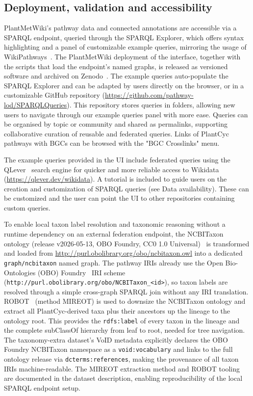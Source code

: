 \documentclass[11pt,a4paper]{article}
\begin{document}
\subsection*{Deployment, validation and accessibility}
PlantMetWiki's pathway data and connected annotations are accessible via a SPARQL
endpoint, queried through the SPARQL Explorer, which offers syntax highlighting and a panel of
customizable example queries, mirroring the usage of WikiPathways~\cite{martens2020}.
The PlantMetWiki deployment of the interface,
together with the scripts that load the endpoint's named graphs, is released as versioned software
and archived on Zenodo~\cite{delpup2026snorql}. The example queries auto-populate the SPARQL
Explorer and can be adapted by users directly on the browser, or in a customizable GitHub repository
(\url{https://github.com/pathway-lod/SPARQLQueries}). This repository stores queries in folders,
allowing new users to navigate through our example queries panel with more ease. Queries
can be organised by topic or community and shared as permalinks, supporting collaborative curation of
reusable and federated queries. Links of PlantCyc pathways with BGCs can be browsed with the "BGC
Crosslinks" menu.

The example queries provided in the UI include federated queries using the QLever~\cite{qlever2017}
search engine for quicker and more reliable access to Wikidata
(\url{https://qlever.dev/wikidata}). A tutorial is included to guide users on the
creation and customization of SPARQL queries (see Data availability). These can be customized and the
user can point the UI to other repositories containing custom queries.

To enable local taxon label resolution and taxonomic reasoning without a runtime dependency on an
external federation endpoint, the NCBITaxon ontology (release v2026-05-13, OBO Foundry, CC0 1.0
Universal)~\cite{federhen2012} is transformed and loaded from \url{http://purl.obolibrary.org/obo/ncbitaxon.owl} into a
dedicated \texttt{graph/ncbitaxon} named graph. The pathway IRIs already use the Open Bio-Ontologies
(OBO) Foundry~\cite{smith2007} IRI scheme
(\texttt{http://\allowbreak{}purl.\allowbreak{}obolibrary.\allowbreak{}org/\allowbreak{}obo/\allowbreak{}NCBITaxon\_\allowbreak{}<id>}), so taxon labels are resolved through a
simple cross-graph SPARQL join without any IRI translation. ROBOT~\cite{jackson2019} (method MIREOT) is
used to downsize the NCBITaxon ontology and extract all PlantCyc-derived taxa plus their ancestors up
the lineage to the ontology root. This provides the \texttt{rdfs:label} of every taxon in the lineage
and the complete subClassOf hierarchy from leaf to root, needed for tree navigation. The
taxonomy-extra dataset's VoID metadata explicitly declares the OBO Foundry NCBITaxon namespace as a
\texttt{void:vocabulary} and links to the full ontology release via \texttt{dcterms:references},
making the provenance of all taxon IRIs machine-readable. The MIREOT extraction method and ROBOT
tooling are documented in the dataset description, enabling reproducibility of the local SPARQL
endpoint setup.
\end{document}
